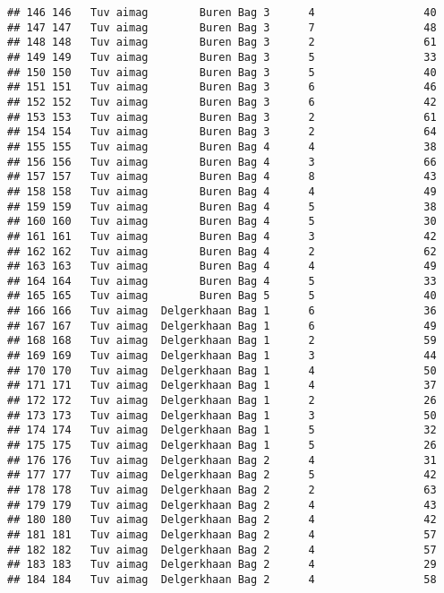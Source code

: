 \documentclass[
]{article}
\begin{document}
\begin{verbatim}
## 146 146   Tuv aimag        Buren Bag 3      4                 40
## 147 147   Tuv aimag        Buren Bag 3      7                 48
## 148 148   Tuv aimag        Buren Bag 3      2                 61
## 149 149   Tuv aimag        Buren Bag 3      5                 33
## 150 150   Tuv aimag        Buren Bag 3      5                 40
## 151 151   Tuv aimag        Buren Bag 3      6                 46
## 152 152   Tuv aimag        Buren Bag 3      6                 42
## 153 153   Tuv aimag        Buren Bag 3      2                 61
## 154 154   Tuv aimag        Buren Bag 3      2                 64
## 155 155   Tuv aimag        Buren Bag 4      4                 38
## 156 156   Tuv aimag        Buren Bag 4      3                 66
## 157 157   Tuv aimag        Buren Bag 4      8                 43
## 158 158   Tuv aimag        Buren Bag 4      4                 49
## 159 159   Tuv aimag        Buren Bag 4      5                 38
## 160 160   Tuv aimag        Buren Bag 4      5                 30
## 161 161   Tuv aimag        Buren Bag 4      3                 42
## 162 162   Tuv aimag        Buren Bag 4      2                 62
## 163 163   Tuv aimag        Buren Bag 4      4                 49
## 164 164   Tuv aimag        Buren Bag 4      5                 33
## 165 165   Tuv aimag        Buren Bag 5      5                 40
## 166 166   Tuv aimag  Delgerkhaan Bag 1      6                 36
## 167 167   Tuv aimag  Delgerkhaan Bag 1      6                 49
## 168 168   Tuv aimag  Delgerkhaan Bag 1      2                 59
## 169 169   Tuv aimag  Delgerkhaan Bag 1      3                 44
## 170 170   Tuv aimag  Delgerkhaan Bag 1      4                 50
## 171 171   Tuv aimag  Delgerkhaan Bag 1      4                 37
## 172 172   Tuv aimag  Delgerkhaan Bag 1      2                 26
## 173 173   Tuv aimag  Delgerkhaan Bag 1      3                 50
## 174 174   Tuv aimag  Delgerkhaan Bag 1      5                 32
## 175 175   Tuv aimag  Delgerkhaan Bag 1      5                 26
## 176 176   Tuv aimag  Delgerkhaan Bag 2      4                 31
## 177 177   Tuv aimag  Delgerkhaan Bag 2      5                 42
## 178 178   Tuv aimag  Delgerkhaan Bag 2      2                 63
## 179 179   Tuv aimag  Delgerkhaan Bag 2      4                 43
## 180 180   Tuv aimag  Delgerkhaan Bag 2      4                 42
## 181 181   Tuv aimag  Delgerkhaan Bag 2      4                 57
## 182 182   Tuv aimag  Delgerkhaan Bag 2      4                 57
## 183 183   Tuv aimag  Delgerkhaan Bag 2      4                 29
## 184 184   Tuv aimag  Delgerkhaan Bag 2      4                 58

\end{verbatim}
\end{document}
